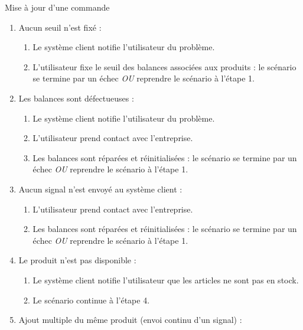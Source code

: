 \begin{UseCase}{Mise à jour d'une commande}
\begin{UseCaseExtension}
    \begin{enumerate}
        \item[1.a] Aucun seuil n'est fixé :
            \begin{enumerate}
                \item Le système client notifie l'utilisateur du problème.
                \item L'utilisateur fixe le seuil des balances associées aux
                    produits : le scénario se termine par un échec \textit{OU}
                    reprendre le scénario à l'étape 1.
            \end{enumerate}
        \item[1.b] Les balances sont défectueuses :
            \begin{enumerate}
                \item Le système client notifie l'utilisateur du problème.
                \item L'utilisateur prend contact avec l'entreprise.
                \item Les balances sont réparées et réinitialisées : le
                    scénario se termine par un échec \textit{OU} reprendre le
                    scénario à l'étape 1.
            \end{enumerate}
        \item[2.a] Aucun signal n'est envoyé au système client :
            \begin{enumerate}
                \item L'utilisateur prend contact avec l'entreprise.
                \item Les balances sont réparées et réinitialisées : le
                    scénario se termine par un échec \textit{OU} reprendre le
                    scénario à l'étape 1.
            \end{enumerate}
        \item[3.a] Le produit n'est pas disponible :
            \begin{enumerate}
                \item Le système client notifie l'utilisateur que les articles
                    ne sont pas en stock.
                \item Le scénario continue à l'étape 4.
            \end{enumerate}
        \item[4.a] Ajout multiple du même produit (envoi continu d'un signal) :
            \begin{enumerate}

\end{enumerate}
\end{enumerate}
\end{UseCaseExtension}
\end{UseCase}
